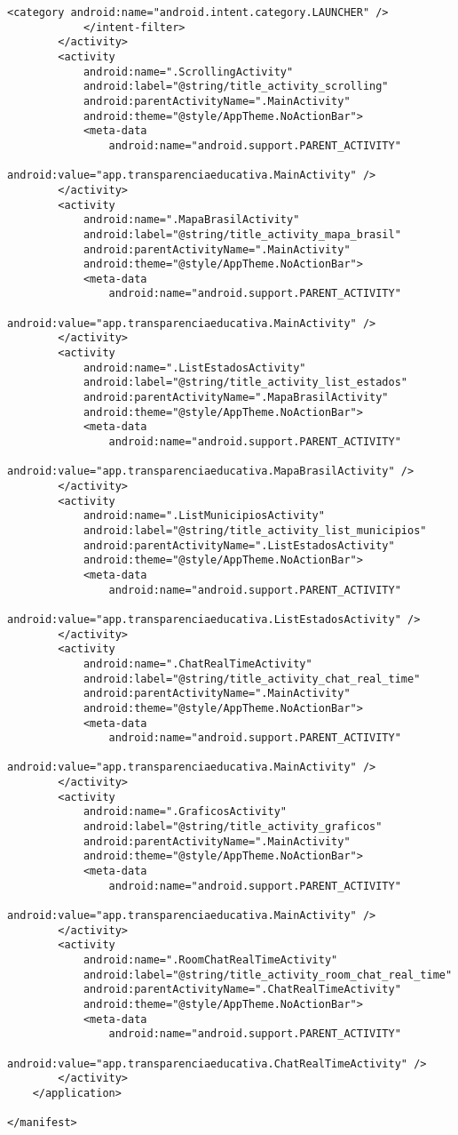 \documentclass[12pt,a4paper]{article}
\begin{document}
\begin{lstlisting}[caption=./mobile/src/main/AndroidManifest.xml]
                <category android:name="android.intent.category.LAUNCHER" />
            </intent-filter>
        </activity>
        <activity
            android:name=".ScrollingActivity"
            android:label="@string/title_activity_scrolling"
            android:parentActivityName=".MainActivity"
            android:theme="@style/AppTheme.NoActionBar">
            <meta-data
                android:name="android.support.PARENT_ACTIVITY"
                android:value="app.transparenciaeducativa.MainActivity" />
        </activity>
        <activity
            android:name=".MapaBrasilActivity"
            android:label="@string/title_activity_mapa_brasil"
            android:parentActivityName=".MainActivity"
            android:theme="@style/AppTheme.NoActionBar">
            <meta-data
                android:name="android.support.PARENT_ACTIVITY"
                android:value="app.transparenciaeducativa.MainActivity" />
        </activity>
        <activity
            android:name=".ListEstadosActivity"
            android:label="@string/title_activity_list_estados"
            android:parentActivityName=".MapaBrasilActivity"
            android:theme="@style/AppTheme.NoActionBar">
            <meta-data
                android:name="android.support.PARENT_ACTIVITY"
                android:value="app.transparenciaeducativa.MapaBrasilActivity" />
        </activity>
        <activity
            android:name=".ListMunicipiosActivity"
            android:label="@string/title_activity_list_municipios"
            android:parentActivityName=".ListEstadosActivity"
            android:theme="@style/AppTheme.NoActionBar">
            <meta-data
                android:name="android.support.PARENT_ACTIVITY"
                android:value="app.transparenciaeducativa.ListEstadosActivity" />
        </activity>
        <activity
            android:name=".ChatRealTimeActivity"
            android:label="@string/title_activity_chat_real_time"
            android:parentActivityName=".MainActivity"
            android:theme="@style/AppTheme.NoActionBar">
            <meta-data
                android:name="android.support.PARENT_ACTIVITY"
                android:value="app.transparenciaeducativa.MainActivity" />
        </activity>
        <activity
            android:name=".GraficosActivity"
            android:label="@string/title_activity_graficos"
            android:parentActivityName=".MainActivity"
            android:theme="@style/AppTheme.NoActionBar">
            <meta-data
                android:name="android.support.PARENT_ACTIVITY"
                android:value="app.transparenciaeducativa.MainActivity" />
        </activity>
        <activity
            android:name=".RoomChatRealTimeActivity"
            android:label="@string/title_activity_room_chat_real_time"
            android:parentActivityName=".ChatRealTimeActivity"
            android:theme="@style/AppTheme.NoActionBar">
            <meta-data
                android:name="android.support.PARENT_ACTIVITY"
                android:value="app.transparenciaeducativa.ChatRealTimeActivity" />
        </activity>
    </application>

</manifest>
\end{lstlisting}
\pagebreak
\end{document}
